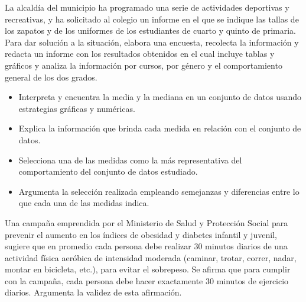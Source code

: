 \ejemplo


La alcaldía del municipio ha programado una serie de actividades deportivas y recreativas, y ha solicitado al colegio un informe en el que se indique las tallas de los zapatos y de los uniformes de los estudiantes de cuarto y quinto de primaria. Para dar solución a la situación, elabora una encuesta, recolecta la información y redacta un informe con los resultados obtenidos en el cual incluye tablas y gráficos y analiza la información por cursos, por género y el comportamiento general de los dos grados.



\evidencias

\begin{itemize}
  \item Interpreta y encuentra la media y la mediana en un conjunto de datos usando estrategias gráficas y numéricas.
  \item Explica la información que brinda cada medida en relación con el conjunto de datos.
  \item Selecciona una de las medidas como la más representativa del comportamiento del conjunto de datos estudiado.
  \item Argumenta la selección realizada empleando semejanzas y diferencias entre lo que cada una de las medidas indica.
\end{itemize}

\ejemplo

Una campaña emprendida por el Ministerio de Salud y Protección Social para prevenir el aumento en los índices de obesidad y diabetes infantil y juvenil, sugiere que en promedio cada persona debe realizar 30 minutos diarios de una actividad física aeróbica de intensidad moderada (caminar, trotar, correr, nadar, montar en bicicleta, etc.), para evitar el sobrepeso. Se afirma que para cumplir con la campaña, cada persona debe hacer exactamente 30 minutos de ejercicio diarios. Argumenta la validez de esta afirmación.



\evidencias

